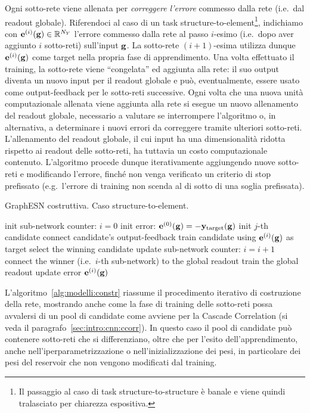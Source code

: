Ogni sotto-rete viene allenata per \emph{correggere l'errore} commesso dalla rete (i.e.\ dal readout globale). Riferendoci al caso di un task structure-to-element\footnote{Il passaggio al caso di task structure-to-structure è banale e viene quindi tralasciato per chiarezza espositiva.}, indichiamo con $\mathbf{e}^{(i)}(\mathbf{g}) \in \mathbb{R}^{N_Y}$ l'errore commesso dalla rete al passo $i$-esimo (i.e.\ dopo aver aggiunto $i$ sotto-reti) sull'input $\mathbf{g}$. La sotto-rete $(i+1)$-esima utilizza dunque $\mathbf{e}^{(i)}(\mathbf{g})$ come target nella propria fase di apprendimento. Una volta effettuato il training, la sotto-rete viene ``congelata'' ed aggiunta alla rete: il suo output diventa un nuovo input per il readout globale e può, eventualmente, essere usato come output-feedback per le sotto-reti successive. Ogni volta che una nuova unità computazionale allenata viene aggiunta alla rete si esegue un nuovo allenamento del readout globale, necessario a valutare se interrompere l'algoritmo o, in alternativa, a determinare i nuovi errori da correggere tramite ulteriori sotto-reti. 
L'allenamento del readout globale, il cui input ha una dimensionalità ridotta rispetto ai readout delle sotto-reti, ha tuttavia un costo computazionale contenuto.
L'algoritmo procede dunque iterativamente aggiungendo nuove sotto-reti e modificando l'errore, finché non venga verificato un criterio di stop prefissato (e.g.\ l'errore di training non scenda al di sotto di una soglia prefissata).

\begin{algorithm}[tb]
\caption{GraphESN costruttiva. Caso structure-to-element.}
\label{alg:modelli:constr}
\begin{algorithmic}
\STATE init sub-network counter: $i = 0$
\STATE init error: $\mathbf{e}^{(0)}(\mathbf{g}) = -\mathbf{y}_\textup{target}(\mathbf{g})$
\REPEAT
		\STATE init $j$-th candidate
		\STATE connect candidate's output-feedback
		\STATE train candidate using $\mathbf{e}^{(i)}(\mathbf{g})$ as target 
	\ENDFOR
	\STATE select the winning candidate
	\STATE update sub-network counter: $i = i+1$
	\STATE connect the winner (i.e.\ $i$-th sub-network) to the global readout
	\STATE train the global readout
	\STATE update error $\mathbf{e}^{(i)}(\mathbf{g})$
\end{algorithmic}
\end{algorithm}

L'algoritmo~\vref{alg:modelli:constr} riassume il procedimento iterativo di costruzione della rete, mostrando anche come la fase di training delle sotto-reti possa avvalersi di un pool di candidate come avviene per la Cascade Correlation (si veda il paragrafo~\ref{sec:intro:cnn:ccorr}). In questo caso il pool di candidate può contenere sotto-reti che si differenziano, oltre che per l'esito dell'apprendimento, anche nell'iperparametrizzazione o nell'inizializzazione dei pesi, in particolare dei pesi del reservoir che non vengono modificati dal training.

